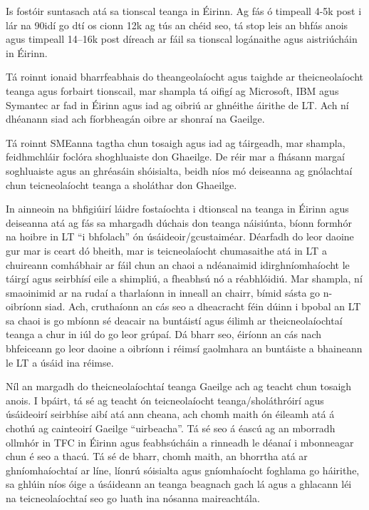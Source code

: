 \documentclass[]{../../metanetpaper}
\begin{document}
\begin{multicols}{2}
Is fostóir suntasach atá sa tionscal teanga in Éirinn. Ag fás ó timpeall 4-5k post i lár na 90idí go dtí os cionn 12k ag tús an chéid seo, tá stop leis an bhfás anois agus timpeall 14--16k post díreach ar fáil sa tionscal logánaithe agus aistriúcháin in Éirinn.

Tá roinnt ionaid bharrfeabhais do theangeolaíocht agus taighde ar theicneolaíocht teanga agus forbairt tionscail, mar shampla tá oifigí ag Microsoft, IBM agus Symantec ar fad in Éirinn agus iad ag oibriú ar ghnéithe áirithe de LT. Ach ní dhéanann siad ach fíorbheagán oibre ar shonraí na Gaeilge.

Tá roinnt SMEanna tagtha chun tosaigh agus iad ag táirgeadh, mar shampla, feidhmchláir foclóra shoghluaiste don Ghaeilge. De réir mar a fhásann margaí soghluaiste agus an ghréasáin shóisialta, beidh níos mó deiseanna ag gnólachtaí chun teicneolaíocht teanga a sholáthar don Ghaeilge.

In ainneoin na bhfigiúirí láidre fostaíochta i dtionscal na teanga in Éirinn agus deiseanna atá ag fás sa mhargadh dúchais don teanga náisiúnta, bíonn formhór na hoibre in LT ``i bhfolach'' ón úsáideoir/gcustaiméar. Déarfadh do leor daoine gur mar is ceart dó bheith, mar is teicneolaíocht chumasaithe atá in LT a chuireann comhábhair ar fáil chun an chaoi a ndéanaimid idirghníomhaíocht le táirgí agus seirbhísí eile a shimpliú, a fheabhsú nó a réabhlóidiú. Mar shampla, ní smaoinimid ar na rudaí a tharlaíonn in inneall an chairr, bímid sásta go n-oibríonn siad. Ach, cruthaíonn an cás seo a dheacracht féin dúinn i bpobal an LT sa chaoi is go mbíonn sé deacair na buntáistí agus éilimh ar theicneolaíochtaí teanga a chur in iúl do go leor grúpaí. Dá bharr seo, éiríonn an cás nach bhfeiceann go leor daoine a oibríonn i réimsí gaolmhara an buntáiste a bhaineann le LT a úsáid ina réimse. 

Níl an margadh do theicneolaíochtaí teanga Gaeilge ach ag teacht chun tosaigh anois. I bpáirt, tá sé ag teacht ón teicneolaíocht teanga/sholáthróirí agus úsáideoirí seirbhíse aibí atá ann cheana, ach chomh maith ón éileamh atá á chothú ag cainteoirí Gaeilge ``uirbeacha''. Tá sé seo á éascú ag an mborradh ollmhór in TFC in Éirinn agus feabhsúcháin a rinneadh le déanaí i mbonneagar chun é seo a thacú. Tá sé de bharr, chomh maith, an bhorrtha atá ar ghníomhaíochtaí ar líne, líonrú sóisialta agus gníomhaíocht foghlama go háirithe, sa ghlúin níos óige a úsáideann an teanga beagnach gach lá agus a ghlacann léi na teicneolaíochtaí seo go luath ina nósanna maireachtála.



\end{multicols}
\end{document}
